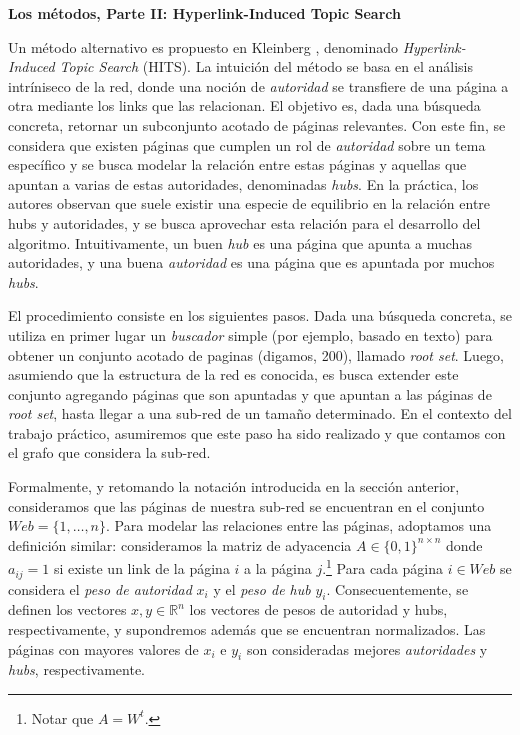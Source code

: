 \documentclass[11pt, a4paper]{article}
\begin{document}
\vskip 5pt
\noindent\textbf{Los m\'etodos, Parte II: Hyperlink-Induced Topic Search}
\vskip 5pt

Un m\'etodo alternativo es propuesto en Kleinberg \cite{Kleinberg}, denominado \emph{Hyperlink-Induced Topic Search} (HITS). La 
intuici\'on del m\'etodo se basa en el an\'alisis intr\'iniseco de la red, donde una noci\'on de \emph{autoridad} se 
transfiere de una p\'agina a otra mediante los links que las relacionan. El objetivo es, dada una b\'usqueda concreta,
retornar un subconjunto acotado de p\'aginas relevantes. Con este fin, se considera que existen p\'aginas que cumplen un 
rol de \emph{autoridad} sobre un tema espec\'ifico y se busca modelar la relaci\'on entre estas p\'aginas y aquellas que 
apuntan a varias de estas autoridades, denominadas \emph{hubs}. En la pr\'actica, los autores observan que suele existir
una especie de equilibrio en la relaci\'on entre hubs y autoridades, y se busca aprovechar esta relaci\'on para el desarrollo
del algoritmo. Intuitivamente, un buen \emph{hub} es una p\'agina que apunta a muchas autoridades, y una buena \emph{autoridad}
es una p\'agina que es apuntada por muchos \emph{hubs}.

El procedimiento consiste en los siguientes pasos. Dada una b\'usqueda concreta, se utiliza en primer lugar un \emph{buscador}
simple (por ejemplo, basado en texto) para obtener un conjunto acotado de paginas (digamos, 200), llamado \emph{root set}. 
Luego, asumiendo que la estructura de la red es conocida, es busca extender este conjunto agregando p\'aginas que son apuntadas
y que apuntan a las p\'aginas de \emph{root set}, hasta llegar a una sub-red de un tama\~no determinado. En el contexto del
trabajo pr\'actico, asumiremos que este paso ha sido realizado y que contamos con el grafo que considera la sub-red.

Formalmente, y retomando la notaci\'on introducida en la secci\'on anterior, consideramos que las p\'aginas de nuestra sub-red
se encuentran en el conjunto $Web = \{1,\dots,n\}$. Para modelar las relaciones entre las p\'aginas, adoptamos una definici\'on 
similar: consideramos la matriz de adyacencia $A \in \{0,1\}^{n \times n}$ donde $a_{ij} = 1$ si existe un link de la p\'agina
$i$ a la p\'agina $j$.\footnote{Notar que $A = W^t$.} Para cada p\'agina $i \in Web$ se considera el \emph{peso de autoridad} $x_i$ 
y el \emph{peso de hub} $y_i$. Consecuentemente, se definen los vectores $x,y \in \mathbb{R}^n$ los vectores de pesos de autoridad
y hubs, respectivamente, y supondremos adem\'as que se encuentran normalizados. Las p\'aginas con mayores valores de $x_i$ e $y_i$
son consideradas mejores \emph{autoridades} y \emph{hubs}, respectivamente.
\end{document}
